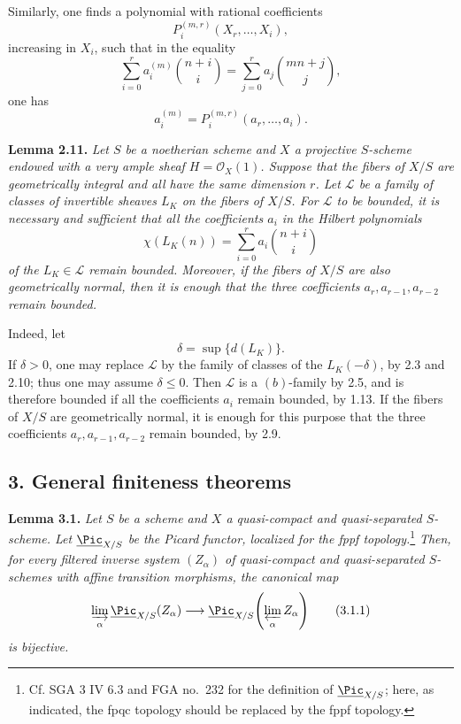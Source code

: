 Similarly, one finds a polynomial with rational coefficients
\[
P_i^{(m,r)}(X_r,\ldots,X_i),
\]
increasing in \(X_i\), such that in the equality
\[
\sum_{i=0}^{r}a_i^{(m)}\binom{n+i}{i}
=\sum_{j=0}^{r}a_j\binom{mn+j}{j},
\]
one has
\[
a_i^{(m)}=P_i^{(m,r)}(a_r,\ldots,a_i).
\]

\textbf{Lemma 2.11.} \emph{Let \(S\) be a noetherian scheme and \(X\)
a projective \(S\)-scheme endowed with a very ample sheaf
\(H=\mathcal O_X(1)\). Suppose that the fibers of \(X/S\) are
geometrically integral and all have the same dimension \(r\). Let
\(\mathcal L\) be a family of classes of invertible sheaves \(L_K\) on the
fibers of \(X/S\). For \(\mathcal L\) to be bounded, it is necessary and
sufficient that all the coefficients \(a_i\) in the Hilbert polynomials}
\[
\chi(L_K(n))=\sum_{i=0}^{r}a_i\binom{n+i}{i}
\]
\emph{of the \(L_K\in\mathcal L\) remain bounded. Moreover, if the
fibers of \(X/S\) are also geometrically normal, then it is enough that
the three coefficients \(a_r,a_{r-1},a_{r-2}\) remain bounded.}

Indeed, let
\[
\delta=\sup\{d(L_K)\}.
\]
If \(\delta>0\), one may replace \(\mathcal L\) by the family of classes
of the \(L_K(-\delta)\), by 2.3 and 2.10; thus one may assume
\(\delta\le0\). Then \(\mathcal L\) is a \((b)\)-family by 2.5, and is
therefore bounded if all the coefficients \(a_i\) remain bounded, by
1.13. If the fibers of \(X/S\) are geometrically normal, it is enough
for this purpose that the three coefficients \(a_r,a_{r-1},a_{r-2}\)
remain bounded, by 2.9.

\subsection*{3. General finiteness theorems}

\textbf{Lemma 3.1.} \emph{Let \(S\) be a scheme and \(X\) a
quasi-compact and quasi-separated \(S\)-scheme. Let
\(\underline{\Pic}_{X/S}\) be the Picard functor, localized for the fppf
topology.}\footnote{Cf. SGA 3 IV 6.3 and FGA no.~232 for the definition of
\(\underline{\Pic}_{X/S}\); here, as indicated, the fpqc topology should be
replaced by the fppf topology.}
\emph{Then, for every filtered inverse system \((Z_\alpha)\) of
quasi-compact and quasi-separated \(S\)-schemes with affine transition
morphisms, the canonical map}
\begin{equation}
\varinjlim_\alpha\underline{\Pic}_{X/S}(Z_\alpha)
\longrightarrow
\underline{\Pic}_{X/S}\!\left(\varprojlim_\alpha Z_\alpha\right)
\tag{3.1.1}
\end{equation}
\emph{is bijective.}

